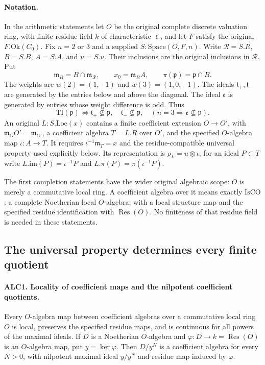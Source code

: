 \documentclass[11pt,a4paper]{article}
\numberwithin{equation}{section}
\theoremstyle{remark}\newtheorem{remark}[theorem]{Remark}
\begin{document}
\paragraph{Notation.}
In the arithmetic statements let \(O\) be the original complete
discrete valuation ring, with finite residue field \(k\) of
characteristic \(\ell\), and let \(F\) satisfy the original
\(F.\mathrm{Ok}(C_0)\).  Fix \(n=2\) or \(3\) and a supplied
\(S:\mathrm{Space}(O,F,n)\).  Write \(\mathcal R=S.R\),
\(B=S.B\), \(A=S.A\), and \(u=S.u\).  Their inclusions are
the original inclusions in \(\mathcal R\).  Put
\[
 \mathfrak m_B=B\cap\mathfrak m_{\mathcal R},\qquad
 x_0=\mathfrak m_B A,\qquad
 \pi(\mathfrak p)=\mathfrak p\cap B.
                                                        \tag{ALC.1}
\]
The weights are \(w(2)=(1,-1)\) and \(w(3)=(1,0,-1)\).
The ideals \(\mathfrak t_+,\mathfrak t_-\) are generated by the
entries below and above the diagonal.  The ideal \(\mathfrak e\)
is generated by entries whose weight difference is odd.  Thus
\[
 \mathrm{TI}(\mathfrak p)
 \Longleftrightarrow
 \mathfrak t_+\not\subseteq\mathfrak p,
 \quad\mathfrak t_-\not\subseteq\mathfrak p,
 \quad(n=3\Rightarrow\mathfrak e\not\subseteq\mathfrak p).
                                                        \tag{ALC.2}
\]
An original \(L:S.\mathrm{Loc}(x)\) contains a finite coefficient
extension \(O\to O'\), with
\(\mathfrak m_OO'=\mathfrak m_{O'}\), a coefficient algebra
\(T=L.R\) over \(O'\), and the specified \(O\)-algebra map
\(\iota:A\to T\).  It requires
\(\iota^{-1}\mathfrak m_T=x\) and the residue-compatible
universal property used explicitly below.  Its representation is
\(\rho_L=u\otimes\iota\); for an ideal \(P\subset T\) write
\(L.\mathrm{im}(P)=\iota^{-1}P\) and
\(L.\pi(P)=\pi(\iota^{-1}P)\).

The first completion statements have the wider original algebraic
scope: \(O\) is merely a commutative local ring.  A coefficient
algebra over it means exactly \(\mathrm{IsCO}\): a complete
Noetherian local \(O\)-algebra, with a local structure map and
the specified residue identification with \(\operatorname{Res}(O)\).
No finiteness of that residue field is needed in these statements.

\subsection{The universal property determines every finite quotient}

\paragraph{ALC1. Locality of coefficient maps and the nilpotent coefficient quotients.}
\label{claim:ALC1}
Every \(O\)-algebra map between coefficient algebras over a
commutative local ring \(O\) is local, preserves the specified
residue maps, and is continuous for all powers of the maximal
ideals.  If \(D\) is a Noetherian \(O\)-algebra and
\(\varphi:D\to k=\operatorname{Res}(O)\) is an
\(O\)-algebra map, put \(y=\ker\varphi\).  Then
\(D/y^N\) is a coefficient algebra for every \(N>0\), with
nilpotent maximal ideal \(y/y^N\) and residue map induced by
\(\varphi\).
\end{document}
